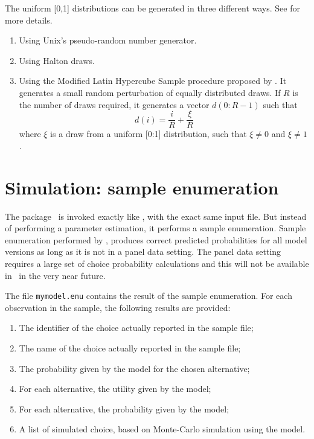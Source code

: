 \documentclass[12pt]{memoir}
\begin{document}
The uniform [0,1] distributions can be generated in three different
ways. See \cite{Trai09} for more details.
\begin{enumerate}
\item Using Unix's pseudo-random number generator.
\item Using Halton draws.
\item Using the Modified Latin Hypercube Sample procedure proposed by .
It generates a small random perturbation of  equally distributed
draws. If $R$ is the number of draws required, it generates a vector
$d(0:R-1)$ such that 
\[
d(i) = \frac{i}{R} + \frac{\xi}{R}
\]
where $\xi$ is a draw from a uniform [0:1] distribution, such that
$\xi \neq 0$ and $\xi \neq 1$.
\end{enumerate}




\section{Simulation: sample enumeration}
\label{sec:biosim}
   The package \BIOSIM\ is invoked exactly like \BIOGEME, with the exact
   same input file. But instead of performing a parameter estimation, it
   performs a sample enumeration.
 Sample enumeration performed by \BIOSIM, produces 
   correct predicted probabilities for all model versions as long as
it is not in a panel data setting.  
   The panel data setting requires a  large set of choice probability calculations and this will not be 
   available in \BIOSIM\ in the very near future. 

   The file \texttt{mymodel.enu} contains the result of the sample enumeration.
   For each observation in the sample, the following results are provided:
   \begin{enumerate}
      \item The identifier of the choice actually reported in the sample file;
      \item The name of the choice actually reported in the sample file;
      \item The probability given by the model for  the chosen alternative;
      \item For each alternative, the utility given by the model;
      \item For each alternative, the probability given by the model;
      \item A list of simulated choice, based on Monte-Carlo simulation using the model.
   \end{enumerate}
\end{document}
